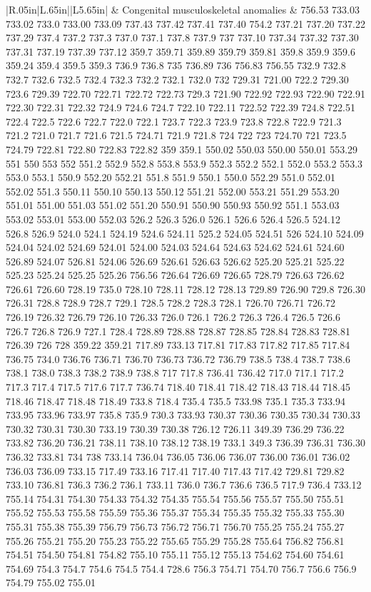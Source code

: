 \begin{longtable}{|R{.05in}|L{.65in}||L{5.65in}|}
    & Congenital musculoskeletal anomalies &  756.53 733.03 733.02 733.0 733.00 733.09 737.43 737.42 737.41 737.40 754.2 737.21 737.20 737.22 737.29 737.4 737.2 737.3 737.0 737.1 737.8 737.9 737 737.10 737.34 737.32 737.30 737.31 737.19 737.39 737.12 359.7 359.71 359.89 359.79 359.81 359.8 359.9 359.6 359.24 359.4 359.5 359.3 736.9 736.8 735 736.89 736 756.83 756.55 732.9 732.8 732.7 732.6 732.5 732.4 732.3 732.2 732.1 732.0 732 729.31 721.00 722.2 729.30 723.6 729.39 722.70 722.71 722.72 722.73 729.3 721.90 722.92 722.93 722.90 722.91 722.30 722.31 722.32 724.9 724.6 724.7 722.10 722.11 722.52 722.39 724.8 722.51 722.4 722.5 722.6 722.7 722.0 722.1 723.7 722.3 723.9 723.8 722.8 722.9 721.3 721.2 721.0 721.7 721.6 721.5 724.71 721.9 721.8 724 722 723 724.70 721 723.5 724.79 722.81 722.80 722.83 722.82 359 359.1 550.02 550.03 550.00 550.01 553.29 551 550 553 552 551.2 552.9 552.8 553.8 553.9 552.3 552.2 552.1 552.0 553.2 553.3 553.0 553.1 550.9 552.20 552.21 551.8 551.9 550.1 550.0 552.29 551.0 552.01 552.02 551.3 550.11 550.10 550.13 550.12 551.21 552.00 553.21 551.29 553.20 551.01 551.00 551.03 551.02 551.20 550.91 550.90 550.93 550.92 551.1 553.03 553.02 553.01 553.00 552.03 526.2 526.3 526.0 526.1 526.6 526.4 526.5 524.12 526.8 526.9 524.0 524.1 524.19 524.6 524.11 525.2 524.05 524.51 526 524.10 524.09 524.04 524.02 524.69 524.01 524.00 524.03 524.64 524.63 524.62 524.61 524.60 526.89 524.07 526.81 524.06 526.69 526.61 526.63 526.62 525.20 525.21 525.22 525.23 525.24 525.25 525.26 756.56 726.64 726.69 726.65 728.79 726.63 726.62 726.61 726.60 728.19 735.0 728.10 728.11 728.12 728.13 729.89 726.90 729.8 726.30 726.31 728.8 728.9 728.7 729.1 728.5 728.2 728.3 728.1 726.70 726.71 726.72 726.19 726.32 726.79 726.10 726.33 726.0 726.1 726.2 726.3 726.4 726.5 726.6 726.7 726.8 726.9 727.1 728.4 728.89 728.88 728.87 728.85 728.84 728.83 728.81 726.39 726 728 359.22 359.21 717.89 733.13 717.81 717.83 717.82 717.85 717.84 736.75 734.0 736.76 736.71 736.70 736.73 736.72 736.79 738.5 738.4 738.7 738.6 738.1 738.0 738.3 738.2 738.9 738.8 717 717.8 736.41 736.42 717.0 717.1 717.2 717.3 717.4 717.5 717.6 717.7 736.74 718.40 718.41 718.42 718.43 718.44 718.45 718.46 718.47 718.48 718.49 733.8 718.4 735.4 735.5 733.98 735.1 735.3 733.94 733.95 733.96 733.97 735.8 735.9 730.3 733.93 730.37 730.36 730.35 730.34 730.33 730.32 730.31 730.30 733.19 730.39 730.38 726.12 726.11 349.39 736.29 736.22 733.82 736.20 736.21 738.11 738.10 738.12 738.19 733.1 349.3 736.39 736.31 736.30 736.32 733.81 734 738 733.14 736.04 736.05 736.06 736.07 736.00 736.01 736.02 736.03 736.09 733.15 717.49 733.16 717.41 717.40 717.43 717.42 729.81 729.82 733.10 736.81 736.3 736.2 736.1 733.11 736.0 736.7 736.6 736.5 717.9 736.4 733.12 755.14 754.31 754.30 754.33 754.32 754.35 755.54 755.56 755.57 755.50 755.51 755.52 755.53 755.58 755.59 755.36 755.37 755.34 755.35 755.32 755.33 755.30 755.31 755.38 755.39 756.79 756.73 756.72 756.71 756.70 755.25 755.24 755.27 755.26 755.21 755.20 755.23 755.22 755.65 755.29 755.28 755.64 756.82 756.81 754.51 754.50 754.81 754.82 755.10 755.11 755.12 755.13 754.62 754.60 754.61 754.69 754.3 754.7 754.6 754.5 754.4 728.6 756.3 754.71 754.70 756.7 756.6 756.9 754.79 755.02 755.01 
\end{longtable}
